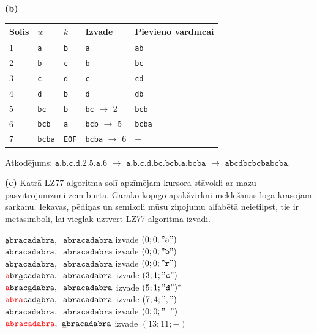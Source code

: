 \documentclass[11pt]{article}
\begin{document}
\noindent
{\bf (b)}

\begin{center}
\begin{tabular}{ |l|l|l|l|l| } \hline
Solis & $w$ & $k$ & Izvade & Pievieno vārdnīcai \\ \hline
1 & {\tt a} & {\tt b} & {\tt a} & {\tt ab} \\
2 & {\tt b} & {\tt c} & {\tt b} & {\tt bc} \\ 
3 & {\tt c} & {\tt d} & {\tt c} & {\tt cd} \\ 
4 & {\tt d} & {\tt b} & {\tt d} & {\tt db} \\ 
5 & {\tt bc} & {\tt b} & {\tt bc} $\rightarrow$ 2 & {\tt bcb} \\ 
6 & {\tt bcb} & {\tt a} & {\tt bcb} $\rightarrow$ 5 & {\tt bcba} \\ 
7 & {\tt bcba} & {\tt EOF} & {\tt bcba} $\rightarrow$ 6 & $-$ \\ \hline
\end{tabular}
\end{center}

Atkodējums: $\mathtt{a.b.c.d.2.5.a.6}$ $\rightarrow$ $\mathtt{a.b.c.d.bc.bcb.a.bcba}$ $\rightarrow$ 
$\mathtt{abcdbcbcbabcba}$.



\noindent
{\bf (c)} Katrā LZ77 algoritma solī apzīmējam kursora stāvokli ar mazu pasvītrojumzīmi zem burta.
Garāko kopīgo apakšvirkni meklēšanas logā krāsojam sarkanu.
Iekavas, pēdiņas un semikoli mūsu ziņojumu alfabētā neietilpst, tie ir metasimboli, lai 
vieglāk uztvert LZ77 algoritma izvadi.

\noindent
$\underline{\mathtt{a}}\mathtt{bracadabra,\;\;abracadabra}$ \textendash{} izvade $(0;0;\mathtt{"a"})$\\
$\mathtt{a}\underline{\mathtt{b}}\mathtt{racadabra,\;\;abracadabra}$ \textendash{} izvade $(0;0;\mathtt{"b"})$\\
$\mathtt{ab}\underline{\mathtt{r}}\mathtt{acadabra,\;\;abracadabra}$ \textendash{} izvade $(0;0;\mathtt{"r"})$\\
$\mathtt{\textcolor{red}{a}br}\underline{\mathtt{a}}\mathtt{cadabra,\;\;abracadabra}$ \textendash{} izvade $(3;1;\mathtt{"c"})$\\
$\mathtt{\textcolor{red}{a}brac}\underline{\mathtt{a}}\mathtt{dabra,\;\;abracadabra}$ \textendash{} izvade $(5;1;\mathtt{"d"})^{\ast}$\\
$\mathtt{\textcolor{red}{abra}cad}\underline{\mathtt{a}}\mathtt{bra,\;\;abracadabra}$ \textendash{} izvade $(7;4;\mathtt{","})$\\
$\mathtt{abracadabra,}\underline{\;\;}\mathtt{abracadabra}$ \textendash{} izvade $(0;0;\mathtt{"\;\;"})$\\
$\mathtt{\textcolor{red}{abracadabra},\;\;}\underline{\mathtt{a}}\mathtt{bracadabra}$ \textendash{} izvade $(13;11;-)$\\
\end{document}
